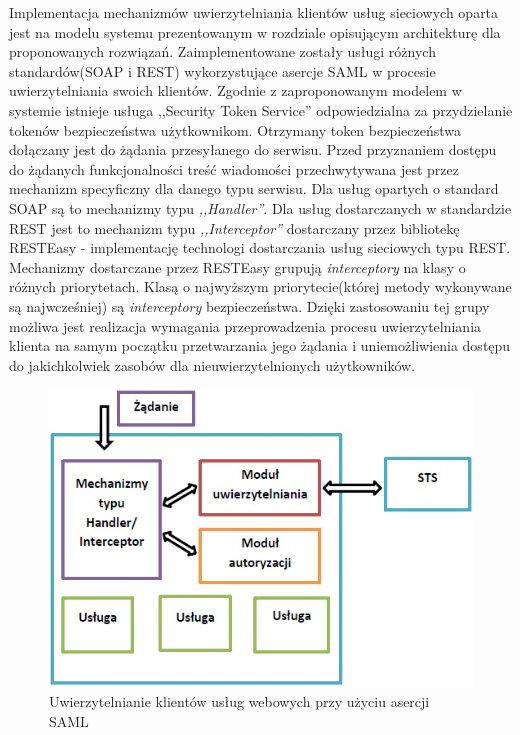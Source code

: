 	Implementacja mechanizmów uwierzytelniania klientów usług sieciowych oparta jest na modelu systemu prezentowanym w rozdziale opisującym architekturę dla proponowanych rozwiązań. Zaimplementowane zostały usługi różnych standardów(SOAP i REST) wykorzystujące asercje SAML w procesie uwierzytelniania swoich klientów. Zgodnie z zaproponowanym modelem w systemie istnieje usługa ,,Security Token Service'' odpowiedzialna za przydzielanie tokenów bezpieczeństwa użytkownikom. Otrzymany token bezpieczeństwa dołączany jest do żądania przesyłanego do serwisu. Przed przyznaniem dostępu do żądanych funkcjonalności treść wiadomości przechwytywana jest przez mechanizm specyficzny dla danego typu serwisu. Dla usług opartych o standard SOAP są to mechanizmy typu \textit{,,Handler''}. Dla usług dostarczanych w standardzie REST jest to mechanizm typu \textit{,,Interceptor''} dostarczany przez bibliotekę RESTEasy - implementację technologi dostarczania usług sieciowych typu REST. Mechanizmy dostarczane przez RESTEasy grupują \textit{interceptory} na klasy o różnych priorytetach. Klasą o najwyższym priorytecie(której metody wykonywane są najwcześniej) są \textit{interceptory} bezpieczeństwa. Dzięki zastosowaniu tej grupy możliwa jest realizacja wymagania przeprowadzenia procesu uwierzytelniania klienta na samym początku przetwarzania jego żądania i uniemożliwienia dostępu do jakichkolwiek zasobów dla nieuwierzytelnionych użytkowników.

	\begin{figure}[h]
		\centering
		\includegraphics{img/interceptorGatewayImplementation.jpg}
		\caption{Uwierzytelnianie klientów usług webowych przy użyciu asercji SAML}
		\label{interceptorGatewayImplementation}
	\end{figure}

